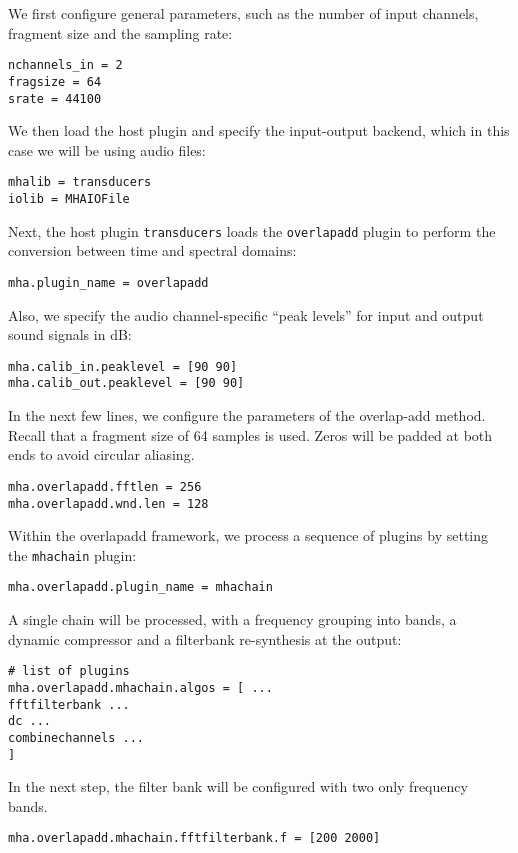 We first configure general parameters, such as the number of input 
channels, fragment size and the sampling rate:
\begin{verbatim}
nchannels_in = 2
fragsize = 64
srate = 44100
\end{verbatim}
%
We then load the host plugin and specify the input-output backend, which 
in this case we will be using audio files:
\begin{verbatim}
mhalib = transducers
iolib = MHAIOFile
\end{verbatim}
%
Next, the host plugin \verb!transducers! loads the \verb!overlapadd! plugin 
to perform the conversion between time and spectral domains:
\begin{verbatim}
mha.plugin_name = overlapadd
\end{verbatim}
%
Also, we specify the audio channel-specific ``peak levels'' for input and output sound 
signals in dB:
\begin{verbatim}
mha.calib_in.peaklevel = [90 90]
mha.calib_out.peaklevel = [90 90]
\end{verbatim}
In the next few lines, we configure the parameters of the overlap-add
method. Recall that a fragment size of 64 samples is used. Zeros will be padded
at both ends to avoid circular aliasing.
\begin{verbatim}
mha.overlapadd.fftlen = 256
mha.overlapadd.wnd.len = 128
\end{verbatim}
%
Within the overlapadd framework, we process a sequence of plugins
by setting the \verb!mhachain! plugin:
\begin{verbatim}
mha.overlapadd.plugin_name = mhachain
\end{verbatim}
%
A single chain will be processed, with a frequency grouping into bands, a dynamic 
compressor and a filterbank re-synthesis at the output:
\begin{verbatim}
# list of plugins
mha.overlapadd.mhachain.algos = [ ... 
fftfilterbank ... 
dc ... 
combinechannels ...
]
\end{verbatim}
In the next step, the filter bank will be configured with two only 
frequency bands. 
\begin{verbatim}
mha.overlapadd.mhachain.fftfilterbank.f = [200 2000]
\end{verbatim}
